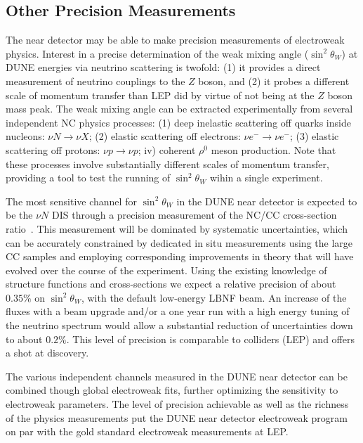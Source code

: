 \subsection{Other Precision Measurements}

The near detector may be able to make precision measurements of electroweak physics.  
Interest in a precise determination of the weak mixing angle ($\sin^2 \theta_W$) at DUNE 
energies via neutrino scattering is twofold: (1) it provides a direct measurement of neutrino couplings to 
the $Z$ boson, and (2) it probes a different scale of momentum transfer than LEP did by virtue
of not being at the $Z$ boson mass peak. 
% 
The weak mixing angle can be extracted experimentally from several independent NC physics processes:
(1) deep inelastic scattering off quarks inside nucleons: $\nu N \to \nu X$; (2) elastic scattering off electrons: $\nu e^- \to \nu e^-$; 
(3) elastic scattering off protons: $\nu p \to \nu p$; iv) coherent $\rho^0$ meson production. 
Note that these processes involve
substantially different scales of momentum transfer, providing a tool
to test the running of $\sin^2 \theta_W$ wihin a single experiment. 

The most sensitive channel for $\sin^2 \theta_W$ 
in the DUNE near detector is expected to be the $\nu N$ DIS through a precision measurement 
of the NC/CC cross-section ratio~\cite{near detector-EW}. This measurement will be dominated by systematic uncertainties, which can be 
accurately constrained by dedicated in situ measurements using the large CC samples and employing corresponding 
improvements in theory that will have evolved over the course of the experiment. Using the existing knowledge of 
structure functions and cross-sections we expect a relative precision of about $0.35\%$ on $\sin^2 \theta_W$, with 
the default low-energy LBNF beam. An increase of the fluxes with a beam upgrade and/or a one year run with a high 
energy tuning of the neutrino spectrum would allow a substantial reduction of uncertainties down to about $0.2\%$. 
This level of precision is comparable to colliders (LEP) and offers a shot at discovery.
 
The various independent channels measured in the DUNE near detector can be combined though global electroweak fits, 
further optimizing the sensitivity to electroweak parameters. The level of precision achievable as well as the richness of 
the physics measurements put the DUNE near detector electroweak program on par with the gold standard electroweak measurements at LEP.   



